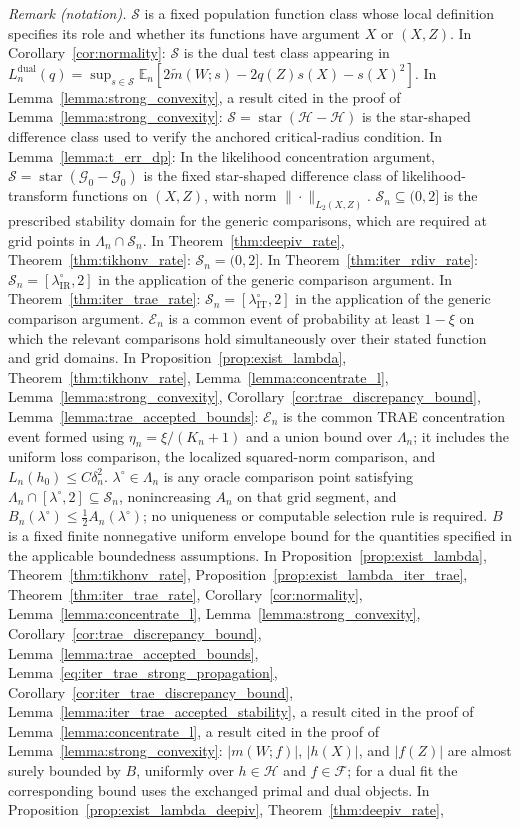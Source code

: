 \documentclass[12pt]{article}
\theoremstyle{plain}
\theoremstyle{definition}
\theoremstyle{remark}
\begin{document}
\noindent\textit{Remark (notation).} $\mathcal S$ is a fixed population function class whose local definition specifies its role and whether its functions have argument $X$ or $(X,Z)$. In Corollary~\ref{cor:normality}: $\mathcal S$ is the dual test class appearing in $L_n^{\mathrm{dual}}(q)=\sup_{s\in\mathcal S}\mathbb E_n[2\tilde m(W;s)-2q(Z)s(X)-s(X)^2]$. In Lemma~\ref{lemma:strong_convexity}, a result cited in the proof of Lemma~\ref{lemma:strong_convexity}: $\mathcal S=\operatorname{star}(\mathcal H-\mathcal H)$ is the star-shaped difference class used to verify the anchored critical-radius condition. In Lemma~\ref{lemma:t_err_dp}: In the likelihood concentration argument, $\mathcal S=\operatorname{star}(\mathcal G_0-\mathcal G_0)$ is the fixed star-shaped difference class of likelihood-transform functions on $(X,Z)$, with norm $\|\cdot\|_{L_2(X,Z)}$. $\mathcal S_n\subseteq(0,2]$ is the prescribed stability domain for the generic comparisons, which are required at grid points in $\Lambda_n\cap\mathcal S_n$. In Theorem~\ref{thm:deepiv_rate}, Theorem~\ref{thm:tikhonv_rate}: $\mathcal S_n=(0,2]$. In Theorem~\ref{thm:iter_rdiv_rate}: $\mathcal S_n=[\lambda_{\mathrm{IR}}^\circ,2]$ in the application of the generic comparison argument. In Theorem~\ref{thm:iter_trae_rate}: $\mathcal S_n=[\lambda_{\mathrm{IT}}^\circ,2]$ in the application of the generic comparison argument. $\mathcal E_n$ is a common event of probability at least $1-\xi$ on which the relevant comparisons hold simultaneously over their stated function and grid domains. In Proposition~\ref{prop:exist_lambda}, Theorem~\ref{thm:tikhonv_rate}, Lemma~\ref{lemma:concentrate_l}, Lemma~\ref{lemma:strong_convexity}, Corollary~\ref{cor:trae_discrepancy_bound}, Lemma~\ref{lemma:trae_accepted_bounds}: $\mathcal E_n$ is the common TRAE concentration event formed using $\eta_n=\xi/(K_n+1)$ and a union bound over $\Lambda_n$; it includes the uniform loss comparison, the localized squared-norm comparison, and $L_n(h_0)\leqslant C\delta_n^2$. $\lambda^\circ\in\Lambda_n$ is any oracle comparison point satisfying $\Lambda_n\cap[\lambda^\circ,2]\subseteq\mathcal S_n$, nonincreasing $A_n$ on that grid segment, and $B_n(\lambda^\circ)\leqslant\tfrac12A_n(\lambda^\circ)$; no uniqueness or computable selection rule is required. $B$ is a fixed finite nonnegative uniform envelope bound for the quantities specified in the applicable boundedness assumptions. In Proposition~\ref{prop:exist_lambda}, Theorem~\ref{thm:tikhonv_rate}, Proposition~\ref{prop:exist_lambda_iter_trae}, Theorem~\ref{thm:iter_trae_rate}, Corollary~\ref{cor:normality}, Lemma~\ref{lemma:concentrate_l}, Lemma~\ref{lemma:strong_convexity}, Corollary~\ref{cor:trae_discrepancy_bound}, Lemma~\ref{lemma:trae_accepted_bounds}, Lemma~\ref{eq:iter_trae_strong_propagation}, Corollary~\ref{cor:iter_trae_discrepancy_bound}, Lemma~\ref{lemma:iter_trae_accepted_stability}, a result cited in the proof of Lemma~\ref{lemma:concentrate_l}, a result cited in the proof of Lemma~\ref{lemma:strong_convexity}: $|m(W;f)|$, $|h(X)|$, and $|f(Z)|$ are almost surely bounded by $B$, uniformly over $h\in\mathcal H$ and $f\in\mathcal F$; for a dual fit the corresponding bound uses the exchanged primal and dual objects. In Proposition~\ref{prop:exist_lambda_deepiv}, Theorem~\ref{thm:deepiv_rate}, 
\end{document}

